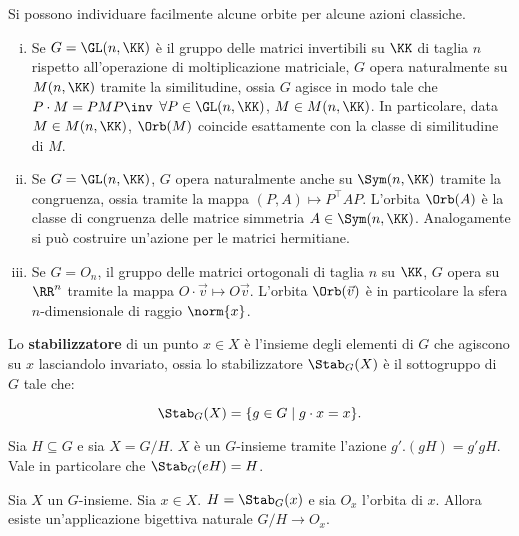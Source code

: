 \documentclass[11pt]{article}
\begin{document}
	\begin{example} Si possono individuare facilmente alcune orbite per alcune azioni classiche.
		\begin{enumerate}[(i)]
			\item Se $G = \GL(n, \KK)$ è il gruppo delle matrici invertibili su $\KK$ di taglia $n$ rispetto
			all'operazione di moltiplicazione matriciale, $G$ opera naturalmente su $M(n, \KK)$ tramite
			la similitudine, ossia $G$ agisce in modo tale che $P \cdot M = P M P\inv$ $\forall P \in \GL(n, \KK)$,
			$M \in M(n, \KK)$. In particolare, data $M \in M(n, \KK)$, $\Orb(M)$ coincide esattamente
			con la classe di similitudine di $M$.
			
			\item Se $G = \GL(n, \KK)$, $G$ opera naturalmente anche su $\Sym(n, \KK)$
			tramite la congruenza, ossia tramite la mappa $(P, A) \mapsto P^\top A P$. L'orbita $\Orb(A)$ è la classe di congruenza delle matrice simmetria $A \in \Sym(n, \KK)$. Analogamente si può costruire un'azione per le
			matrici hermitiane.
			
			\item Se $G = O_n$, il gruppo delle matrici ortogonali di taglia $n$ su $\KK$, $G$ opera su $\RR^n$ tramite la mappa $O \cdot \vec v \mapsto O \vec v$. L'orbita $\Orb(\vec v)$ è in particolare la sfera $n$-dimensionale di raggio $\norm{x}$.
		\end{enumerate}
	\end{example}

	\begin{definition} [stabilizzatore di $x$]
		Lo \textbf{stabilizzatore} di un punto $x \in X$ è l'insieme degli elementi di $G$ che
		agiscono su $x$ lasciandolo invariato, ossia lo stabilizzatore $\Stab_G(X)$ è il sottogruppo
		di $G$ tale che:
		
		\[ \Stab_G(X) = \{g \in G \mid g \cdot x = x \}. \]
	\end{definition}

	\begin{example}
		Sia $H \subseteq G$ e sia $X = G/H$. $X$ è un $G$-insieme
		tramite l'azione $g'.(gH) = g'gH$. Vale in particolare
		che $\Stab_G(eH) = H$.
	\end{example}

	\begin{proposition}
		Sia $X$ un $G$-insieme. Sia $x \in X$. $H = \Stab_G(x)$ e sia
		$O_x$ l'orbita di $x$. Allora esiste un'applicazione bigettiva
		naturale $G/H \to O_x$.
	\end{proposition}
\end{document}
